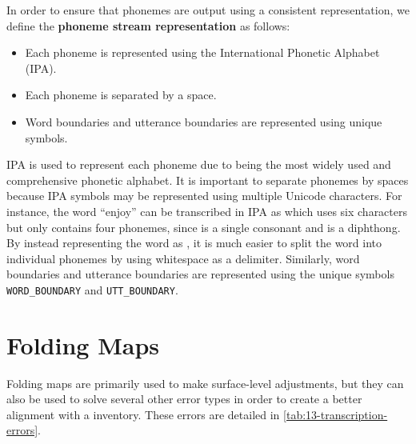 In order to ensure that phonemes are output using a consistent representation, we define the \textbf{phoneme stream representation} as follows:
\begin{itemize}
    \item Each phoneme is represented using the International Phonetic Alphabet (IPA).
    \item Each phoneme is separated by a space.
    \item Word boundaries and utterance boundaries are represented using unique symbols.
\end{itemize}

IPA is used to represent each phoneme due to being the most widely used and comprehensive phonetic alphabet. It is important to separate phonemes by spaces because IPA symbols may be represented using multiple Unicode characters. For instance, the word ``enjoy'' can be transcribed in IPA as  which uses six characters but only contains four phonemes, since  is a single consonant and  is a diphthong. By instead representing the word as , it is much easier to split the word into individual phonemes by using whitespace as a delimiter. Similarly, word boundaries and utterance boundaries are represented using the unique symbols \texttt{WORD\_BOUNDARY} and \texttt{UTT\_BOUNDARY}. 

\section{Folding Maps}\label{sec:13-folding-details}

Folding maps are primarily used to make surface-level adjustments, but they can also be used to solve several other error types in order to create a better alignment with a \phoible inventory. These errors are detailed in \cref{tab:13-transcription-errors}.

